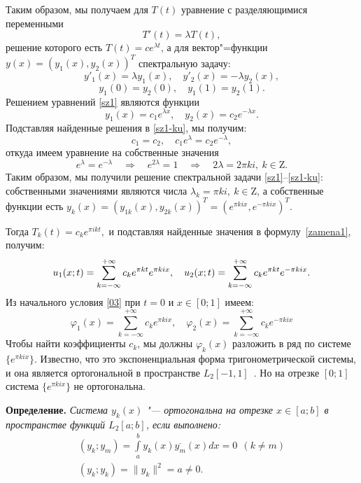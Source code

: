 Таким образом, мы получаем для $T(t)$ уравнение с разделяющимися
переменными
$$T'(t)=\lambda T(t),$$ решение которого есть $T(t)=c e^{\lambda t}$, а для вектор"=функции\\ $y(x)=(y_1(x), y_2(x))^T$  спектральную
задачу:
\begin{equation}\label{sz1}
y'_1(x)=\lambda y_1(x), \quad y'_2(x)=-\lambda y_2(x),
\end{equation}
\begin{equation}\label{sz1-ku}
   y_{1}(0)= y_{2}(0), \quad y_{1}(1)= y_{2}(1).
\end{equation}
Решением уравнений \eqref{sz1} являются функции
$$
   y_{1}(x)= c_{1}e^{\lambda x   }, \quad y_{2}(x)= c_{2} e^{-\lambda x  }.
$$
 Подставляя найденные решения в \eqref{sz1-ku}, мы получим:
$$c_{1}=c_{2}, \quad  c_{1}e^{\lambda    }=c_{2}e^{-\lambda    }, $$
откуда имеем уравнение на собственные значения
$$ e^{\lambda} = e^{-\lambda    }   \quad \Rightarrow  \quad  e^{2\lambda   }=1 \quad \Rightarrow  \quad 2\lambda=2\pi
k i, \ k\in \mathrm{Z}.
   $$
Таким образом, мы получили решение спектральной задачи
\eqref{sz1}--\eqref{sz1-ku}: собственными значениями являются числа
$\lambda_k={\pi k i}, \  k\in \mathrm{Z}$, а собственные функции
есть $ y_{k}(x)=\left(y_{1k}(x), y_{2k}(x)\right)^T= \left(e^{\pi
kix}, e^{-\pi kix}\right)^T$.



Тогда $ T_{k}(t)=c_{k}e^{\pi i kt},$ и подставляя найденные значения
в формулу~\eqref{zamena1}, получим:
\begin{equation*}
   u_{1}(x;t)= \sum\limits_{k=-\infty}^{+\infty}c_{k}e^{\pi kt}e^{\pi
   kix},\quad
   u_{2}(x;t)= \sum\limits_{k=-\infty}^{+\infty}c_{k}e^{\pi kt}e^{-\pi kix}.\\
\end{equation*}
Из начального условия \eqref{03} при $t=0$ и $x\in[0;1]$   имеем:
 \begin{equation}\label{fi01}
        \varphi_{1}(x)= \sum\limits_{k=-\infty}^{+\infty}c_{k}e^{\pi
        kix}, \quad
    \varphi_{2}(x)= \sum\limits_{k=-\infty}^{+\infty}c_{k}e^{-\pi
    kix}
    \end{equation}
Чтобы найти коэффициенты $c_{k}$, мы должны $\varphi_k(x)$ разложить
в ряд по системе $\{e^{\pi kix}\}$. Известно, что это
экспоненциальная форма тригонометрической  системы, и она является
ортогональной в пространстве $L_2[-1,1]$~\cite{Bari}. Но на отрезке
$[0;1]$   система $\{e^{\pi kix}\}$ не ортогональна.


{\bf Определение. } {\it Система ${y_{k}(x)}$ "--- ортогональна на
отрезке $x\in[a;b]$ в пространстве функций $L_{2} [a;b]$, если
выполнено:
\begin{eqnarray*}
 &  (y_{k};y_{m})=\int\limits^b_a{y_{k}}(x){ \overline{y_{m}}(x)}dx=0 \ \ (k \neq m)  & \\
  & (y_{k};y_{k}) =
   \parallel y_{k}\parallel^2=a \neq 0. &
\end{eqnarray*}
}

